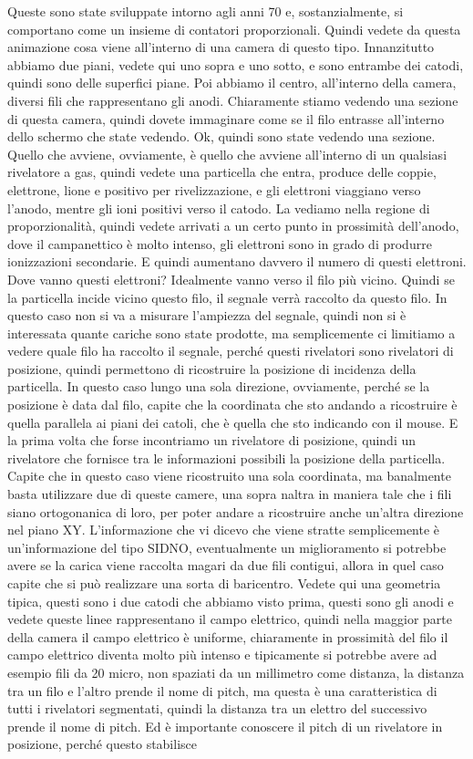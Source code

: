 {Queste sono state sviluppate intorno agli anni 70 e, sostanzialmente, si comportano come un insieme di contatori proporzionali. Quindi vedete da questa animazione cosa viene all'interno di una camera di questo tipo. Innanzitutto abbiamo due piani, vedete qui uno sopra e uno sotto, e sono entrambe dei catodi, quindi sono delle superfici piane. Poi abbiamo il centro, all'interno della camera, diversi fili che rappresentano gli anodi. Chiaramente stiamo vedendo una sezione di questa camera, quindi dovete immaginare come se il filo entrasse all'interno dello schermo che state vedendo. Ok, quindi sono state vedendo una sezione. Quello che avviene, ovviamente, è quello che avviene all'interno di un qualsiasi rivelatore a gas, quindi vedete una particella che entra, produce delle coppie, elettrone, lione e positivo per rivelizzazione, e gli elettroni viaggiano verso l'anodo, mentre gli ioni positivi verso il catodo. La vediamo nella regione di proporzionalità, quindi vedete arrivati a un certo punto in prossimità dell'anodo, dove il campanettico è molto intenso, gli elettroni sono in grado di produrre ionizzazioni secondarie. E quindi aumentano davvero il numero di questi elettroni. Dove vanno questi elettroni? Idealmente vanno verso il filo più vicino. Quindi se la particella incide vicino questo filo, il segnale verrà raccolto da questo filo. In questo caso non si va a misurare l'ampiezza del segnale, quindi non si è interessata quante cariche sono state prodotte, ma semplicemente ci limitiamo a vedere quale filo ha raccolto il segnale, perché questi rivelatori sono rivelatori di posizione, quindi permettono di ricostruire la posizione di incidenza della particella. In questo caso lungo una sola direzione, ovviamente, perché se la posizione è data dal filo, capite che la coordinata che sto andando a ricostruire è quella parallela ai piani dei catoli, che è quella che sto indicando con il mouse. E la prima volta che forse incontriamo un rivelatore di posizione, quindi un rivelatore che fornisce tra le informazioni possibili la posizione della particella. Capite che in questo caso viene ricostruito una sola coordinata, ma banalmente basta utilizzare due di queste camere, una sopra naltra in maniera tale che i fili siano ortogonanica di loro, per poter andare a ricostruire anche un'altra direzione nel piano XY. L'informazione che vi dicevo che viene stratte semplicemente è un'informazione del tipo SIDNO, eventualmente un miglioramento si potrebbe avere se la carica viene raccolta magari da due fili contigui, allora in quel caso capite che si può realizzare una sorta di baricentro. Vedete qui una geometria tipica, questi sono i due catodi che abbiamo visto prima, questi sono gli anodi e vedete queste linee rappresentano il campo elettrico, quindi nella maggior parte della camera il campo elettrico è uniforme, chiaramente in prossimità del filo il campo elettrico diventa molto più intenso e tipicamente si potrebbe avere ad esempio fili da 20 micro, non spaziati da un millimetro come distanza, la distanza tra un filo e l'altro prende il nome di pitch, ma questa è una caratteristica di tutti i rivelatori segmentati, quindi la distanza tra un elettro del successivo prende il nome di pitch. Ed è importante conoscere il pitch di un rivelatore in posizione, perché questo stabilisce }

